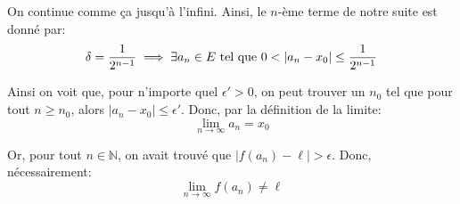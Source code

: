 \documentclass[a4paper]{article}
\begin{document}
{{            On continue comme ça jusqu'à l'infini. Ainsi, le $n$-ème terme de notre suite est donné par:
            \[\delta = \frac{1}{2^{n-1}} \implies \exists a_n \in E \telque 0 < \left|a_n - x_0\right| \leq \frac{1}{2^{n-1}}\]

            Ainsi on voit que, pour n'importe quel $\epsilon' > 0$, on peut trouver un $n_0$ tel que pour tout $n \geq n_0$, alors $\left|a_n - x_0\right| \leq \epsilon'$. Donc, par la définition de la limite:
            \[\lim_{n \to \infty} a_n = x_0\]

            Or, pour tout $n \in \mathbb{N}$, on avait trouvé que $\left|f\left(a_n\right) - \ell\right| > \epsilon$. Donc, nécessairement:
            \[\lim_{n \to \infty} f\left(a_n\right) \neq \ell\]

        }
    }

\end{document}
